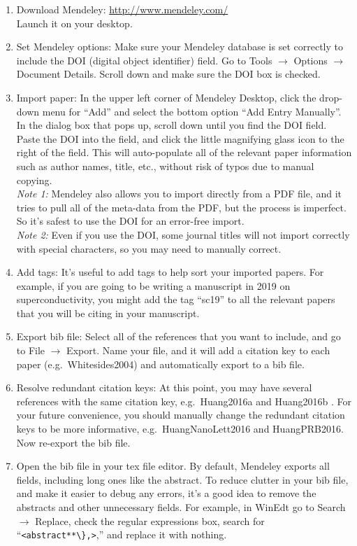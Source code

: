\documentclass[aps,prb,twocolumn,superscriptaddress,floatfix,longbibliography]{revtex4-2}
\begin{document}
\begin{enumerate}
\item Download Mendeley: \url{http://www.mendeley.com/}\\ Launch it on your desktop.
\item Set Mendeley options: Make sure your Mendeley database is set correctly to include the DOI (digital object identifier) field. Go to Tools $\rightarrow$ Options $\rightarrow$ Document Details. Scroll down and make sure the DOI box is checked.
\item Import paper: In the upper left corner of Mendeley Desktop, click the drop-down menu for ``Add'' and select the bottom option ``Add Entry Manually''. In the dialog box that pops up, scroll down until you find the DOI field. Paste the DOI into the field, and click the little magnifying glass icon to the right of the field. This will auto-populate all of the relevant paper information such as author names, title, etc., without risk of typos due to manual copying.\\
    \textit{Note 1:} Mendeley also allows you to import directly from a PDF file, and it tries to pull all of the meta-data from the PDF, but the process is imperfect. So it's safest to use the DOI for an error-free import.\\
    \textit{Note 2:} Even if you use the DOI, some journal titles will not import correctly with special characters, so you may need to manually correct.
\item Add tags: It's useful to add tags to help sort your imported papers. For example, if you are going to be writing a manuscript in 2019 on superconductivity, you might add the tag ``sc19'' to all the relevant papers that you will be citing in your manuscript.
\item Export bib file: Select all of the references that you want to include, and go to File $\rightarrow$ Export.  Name your file, and it will add a citation key to each paper (e.g.\ Whitesides2004) and automatically export to a bib file.
\item Resolve redundant citation keys: At this point, you may have several references with the same citation key, e.g.\ Huang2016a and Huang2016b \cite{HuangNanoLett2016, HuangPRB2016}. For your future convenience, you should manually change the redundant citation keys to be more informative, e.g.\ HuangNanoLett2016 and HuangPRB2016. Now re-export the bib file.
\item Open the bib file in your tex file editor. By default, Mendeley exports all fields, including long ones like the abstract. To reduce clutter in your bib file, and make it easier to debug any errors, it's a good idea to remove the abstracts and other unnecessary fields. For example, in WinEdt go to Search $\rightarrow$ Replace, check the regular expressions box, search for ``{\tt <abstract**\textbackslash\},>},'' and replace it with nothing.
\end{enumerate}
\end{document}
